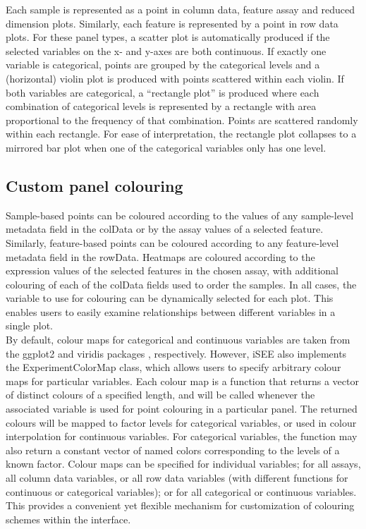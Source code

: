 \documentclass[10pt,a4paper,twocolumn]{article}
\begin{document}
Each sample is represented as a point in column data, feature assay and reduced dimension plots.
Similarly, each feature is represented by a point in row data plots.
For these panel types, a scatter plot is automatically produced if the selected variables on the x- and y-axes are both continuous.
If exactly one variable is categorical, points are grouped by the categorical levels and a (horizontal) violin plot is produced with points scattered within each violin.
If both variables are categorical, a ``rectangle plot'' is produced where each combination of categorical levels is represented by a rectangle with area proportional to the frequency of that combination.
Points are scattered randomly within each rectangle.
For ease of interpretation, the rectangle plot collapses to a mirrored bar plot when one of the categorical variables only has one level.

\subsection*{Custom panel colouring}
Sample-based points can be coloured according to the values of any sample-level metadata field in the colData or by the assay values of a selected feature.
Similarly, feature-based points can be coloured according to any feature-level metadata field in the rowData.
Heatmaps are coloured according to the expression values of the selected features in the chosen assay,
with additional colouring of each of the colData fields used to order the samples.
In all cases, the variable to use for colouring can be dynamically selected for each plot.
This enables users to easily examine relationships between different variables in a single plot. \\

By default, colour maps for categorical and continuous variables are taken from the ggplot2 \citep{wickham2009ggplot2} and viridis packages \citep{garnier2018viridis}, respectively.
However, iSEE also implements the ExperimentColorMap class, which allows users to specify arbitrary colour maps for particular variables.
Each colour map is a function that returns a vector of distinct colours of a specified length, and will be called whenever the associated variable is used for point colouring in a particular panel.
The returned colours will be mapped to factor levels for categorical variables, or used in colour interpolation for continuous variables.
For categorical variables, the function may also return a constant vector of named colors corresponding to the levels of a known factor.
Colour maps can be specified for individual variables; for all assays, all column data variables, or all row data variables (with different functions for continuous or categorical variables); or for all categorical or continuous variables.
This provides a convenient yet flexible mechanism for customization of colouring schemes within the interface.
\end{document}

